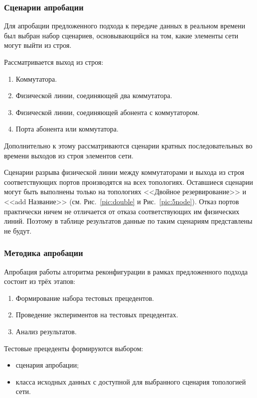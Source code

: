 \documentclass[12pt, a4paper]{article}
\begin{document}
\subsubsection{Сценарии апробации}

Для апробации предложенного подхода к передаче данных в реальном времени был выбран набор сценариев, основывающийся на том, какие элементы сети могут выйти из строя. 

Рассматривается выход из строя:
\begin{enumerate}
	\item Коммутатора.
	\item Физической линии, соединяющей два коммутатора.
	\item Физической линии, соединяющей абонента с коммутатором.
	\item Порта абонента или коммутатора.
\end{enumerate}

Дополнительно к этому рассматриваются сценарии кратных последовательных во времени выходов из строя элементов сети.

Сценарии разрыва физической линии между коммутаторами и выхода из строя соответствующих портов производятся на всех топологиях. Оставшиеся сценарии могут быть выполнены только на топологиях <<Двойное резервирование>> и <<add Название>> (см. Рис.~\ref{pic:double} и Рис.~\ref{pic:5node}). Отказ портов практически ничем не отличается от отказа соответствующих им физических линий. Поэтому в таблице результатов данные по таким сценариям представлены не будут.

\subsubsection{Методика апробации}
Апробация работы алгоритма реконфигурации в рамках предложенного подхода состоит из трёх этапов:
\begin{enumerate}
	\item Формирование набора тестовых прецедентов.
	\item Проведение экспериментов на тестовых прецедентах.
	\item Анализ результатов.
\end{enumerate}

Тестовые прецеденты формируются выбором:
\begin{itemize}
	\item сценария апробации;
	\item класса исходных данных с доступной для выбранного сценария топологией сети.
\end{itemize}
\end{document}
